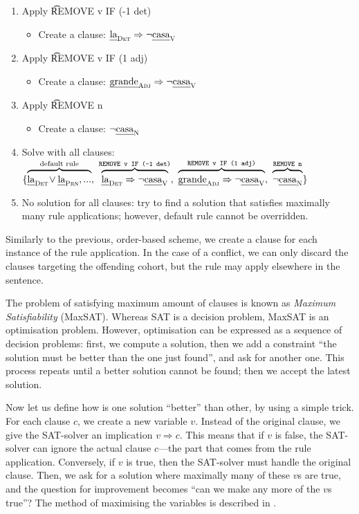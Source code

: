 \begin{enumerate}
\item Apply \t{REMOVE v IF (-1 det)}
 \begin{itemize}
    \item Create a clause: $\text{\em la}_{\text{\sc Det}} \Rightarrow \neg \text{\em casa}_{\text{\sc V}}$
 \end{itemize}
\item Apply \t{REMOVE v IF (1 adj)}
 \begin{itemize}
    \item Create a clause: $\text{\em grande}_{\text{\sc Adj}} \Rightarrow \neg \text{\em casa}_{\text{\sc V}}$
 \end{itemize}
\item Apply \t{REMOVE n}
 \begin{itemize}
    \item Create a clause: $\neg \text{\em casa}_{\text{\sc N}}$
 \end{itemize}

\item Solve with all clauses:
  $\{ \ob{\laDet \! \vee \laPrn, ...}^{\text{default rule}}, \
      \ob{\laDet \Rightarrow \neg \casaV}^{\t{REMOVE v IF (-1 det)}}, \
      \ob{\grandeAdj \Rightarrow \neg \casaV}^{\t{REMOVE v IF (1 adj)}}, \
      \ob{\neg \casaN}^{\t{REMOVE n}} \}$
\item No solution for all clauses: try to find a solution that satisfies maximally many rule applications; however, default rule cannot be overridden.
\end{enumerate}

Similarly to the previous, order-based scheme, we create a clause for each
instance of the rule application. In the case of a conflict, we can
only discard the clauses targeting the offending cohort, but the rule may apply
elsewhere in the sentence.


The problem of satisfying maximum amount of clauses is known as \emph{Maximum Satisfiability} (MaxSAT).
Whereas SAT is a decision problem, MaxSAT is an optimisation problem.
However, optimisation can be expressed as a sequence of decision problems:
first, we compute a solution, then we add a constraint ``the solution must be better than the one just found'', and ask for another one.
This process repeats until a better solution cannot be found; then we accept the
latest solution.

Now let us define how is one solution ``better'' than other,
by using a simple trick.
For each clause $c$, we create a new variable $v$.
Instead of the original clause, we give the SAT-solver
an implication $v \Rightarrow c$.
This means that if $v$ is false, the SAT-solver can ignore the
actual clause $c$---the part that comes from the rule application.
Conversely, if $v$ is true, then the SAT-solver must handle
the original clause.
Then, we ask for a solution where maximally many of these $v$s are true,
and the question for improvement becomes ``can we make any more of the $v$s true''?
The method of maximising the variables is described in \citet{een06minisatplus}.

